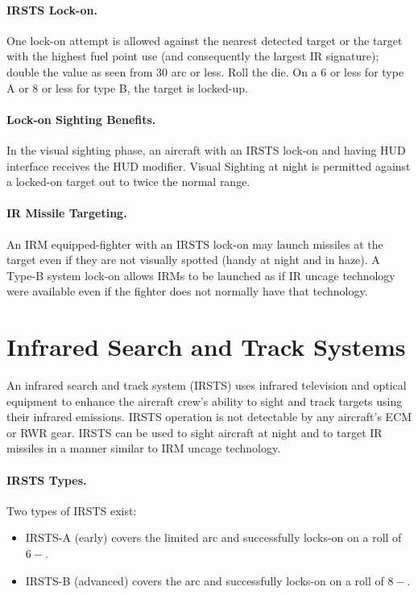 \begin{advancedrules}
{\paragraph{IRSTS Lock-on.} One lock-on attempt is allowed against the nearest detected target or the target with the highest fuel point use (and consequently the largest IR signature); double the value as seen from 30{\deg} arc or less. Roll the die. On a 6 or less for type A or 8 or less for type B, the target is locked-up.

\paragraph{Lock-on Sighting Benefits.} In the visual sighting phase, an aircraft with an IRSTS lock-on and having HUD interface receives the HUD modifier. Visual Sighting at night is permitted against a locked-on target out to twice the normal range.

\paragraph{IR Missile Targeting.} An IRM equipped-fighter with an IRSTS lock-on may launch missiles at the target even if they are not visually spotted (handy at night and in haze).  A Type-B system lock-on allows IRMs to be launched as if IR uncage technology were available even if the fighter does not normally have that technology.
}{

\section{Infrared Search and Track Systems}
\label{rule:irsts}

An infrared search and track system (IRSTS) uses infrared television and optical equipment to enhance the aircraft crew’s ability to sight and track targets using their infrared emissions. IRSTS operation is not detectable by any aircraft’s ECM or RWR gear. IRSTS can be used to sight aircraft at night and to target IR missiles in a manner similar to IRM uncage technology.

\paragraph{IRSTS Types.} Two types of IRSTS exist: 
\begin{itemize}
    \item IRSTS-A (early) covers the limited arc and successfully locks-on on a roll of $6-$.
    \item IRSTS-B (advanced) covers the  arc and successfully locks-on on a roll of $8-$.
\end{itemize}

}
\end{advancedrules}
